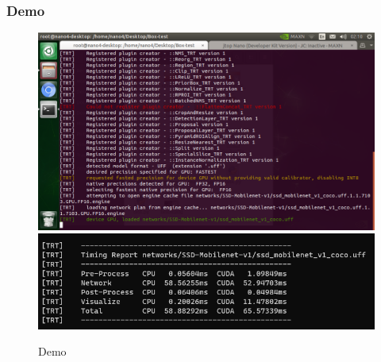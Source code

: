 \documentclass{beamer}
\begin{document}
\begin{frame}
    \frametitle{Demo} 
    \begin{figure}[H]
        \centering
        \includegraphics[width=.6\textwidth]{img/report11.png}
        \includegraphics[width=.6\textwidth]{img/report6.png}
        \caption{Demo}
        \label{img5}
    \end{figure}
\end{frame}
\end{document}
